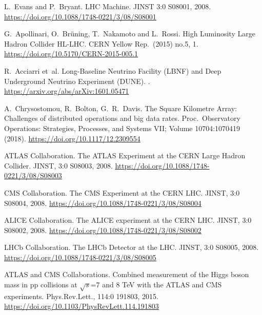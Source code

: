 \documentclass[11pt]{article}
\begin{document}
\begin{thebibliography}{99}
\itemsep=1pt
\begin{small}

L.~Evans and P.~Bryant.
\newblock LHC Machine.
\newblock JINST 3:0 S08001, 2008.
\newblock \href{https://doi.org/10.1088/1748-0221/3/08/S08001}{https://doi.org/10.1088/1748-0221/3/08/S08001}

G.~Apollinari, O.~Brüning, T.~Nakamoto and L.~Rossi.
\newblock High Luminosity Large Hadron Collider HL-LHC.
\newblock CERN Yellow Rep.\  (2015) no.5,  1.
\newblock \href{https://doi.org/10.5170/CERN-2015-005.1}{https://doi.org/10.5170/CERN-2015-005.1}

R.~Acciarri et~al.
\newblock Long-Baseline Neutrino Facility (LBNF) and Deep Underground Neutrino Experiment (DUNE).
.
\newblock \href{https://arxiv.org/abs/arXiv:1601.05471}{https://arxiv.org/abs/arXiv:1601.05471}

A.~Chrysostomou, R.~Bolton, G.~R.~Davis.
\newblock The Square Kilometre Array: Challenges of distributed operations and big data rates.
\newblock Proc.\ Observatory Operations: Strategies, Processes, and Systems VII; Volume 10704:1070419 (2018).
\newblock \href{https://doi.org/10.1117/12.2309554}{https://doi.org/10.1117/12.2309554}

ATLAS Collaboration.
\newblock The ATLAS Experiment at the CERN Large Hadron Collider.
\newblock JINST, 3:0 S08003, 2008.
\newblock \href{https://doi.org/10.1088/1748-0221/3/08/S08003}{https://doi.org/10.1088/1748-0221/3/08/S08003}

CMS Collaboration.
\newblock The CMS Experiment at the CERN LHC.
\newblock JINST, 3:0 S08004, 2008.
\newblock \href{https://doi.org/10.1088/1748-0221/3/08/S08004}{https://doi.org/10.1088/1748-0221/3/08/S08004}

ALICE Collaboration.
\newblock The ALICE experiment at the CERN LHC.
\newblock JINST, 3:0 S08002, 2008.
\newblock \href{https://doi.org/10.1088/1748-0221/3/08/S08002}{https://doi.org/10.1088/1748-0221/3/08/S08002}

LHCb Collaboration.
\newblock The LHCb Detector at the LHC.
\newblock JINST, 3:0 S08005, 2008.
\newblock \href{https://doi.org/10.1088/1748-0221/3/08/S08005}{https://doi.org/10.1088/1748-0221/3/08/S08005}

ATLAS and CMS Collaborations.
\newblock Combined measurement of the Higgs boson mass in pp collisions at $\sqrt{s}$=7 and 8 {TeV} with the ATLAS and CMS experiments.
\newblock Phys.Rev.Lett., 114:0 191803, 2015.
\newblock \href{https://doi.org/10.1103/PhysRevLett.114.191803}{https://doi.org/10.1103/PhysRevLett.114.191803}


\end{small}
\end{thebibliography}
\end{document}

